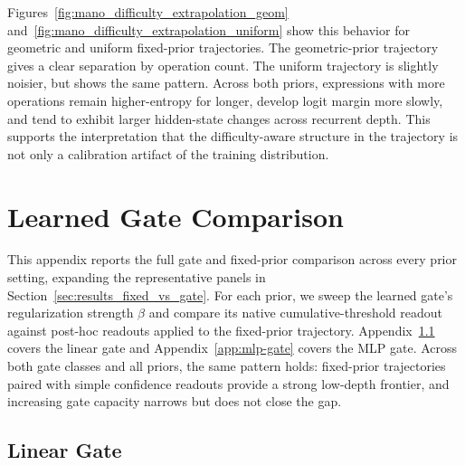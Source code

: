 \documentclass[10pt]{article} %
\begin{document}
Figures~\ref{fig:mano_difficulty_extrapolation_geom} and~\ref{fig:mano_difficulty_extrapolation_uniform} show this behavior for geometric and uniform fixed-prior trajectories. The geometric-prior trajectory gives a clear separation by operation count. The uniform trajectory is slightly noisier, but shows the same pattern. Across both priors, expressions with more operations remain higher-entropy for longer, develop logit margin more slowly, and tend to exhibit larger hidden-state changes across recurrent depth. This supports the interpretation that the difficulty-aware structure in the trajectory is not only a calibration artifact of the training distribution.

\section{Learned Gate Comparison}
\label{app:gate_vs_fixed}

This appendix reports the full gate and fixed-prior comparison across every prior setting, expanding the representative panels in Section~\ref{sec:results_fixed_vs_gate}. For each prior, we sweep the learned gate's regularization strength \(\beta\) and compare its native cumulative-threshold readout against post-hoc readouts applied to the fixed-prior trajectory. Appendix~\ref{app:linear-gate} covers the linear gate and Appendix~\ref{app:mlp-gate} covers the MLP gate. Across both gate classes and all priors, the same pattern holds: fixed-prior trajectories paired with simple confidence readouts provide a strong low-depth frontier, and increasing gate capacity narrows but does not close the gap.

\subsection{Linear Gate}
\label{app:linear-gate}
\end{document}

